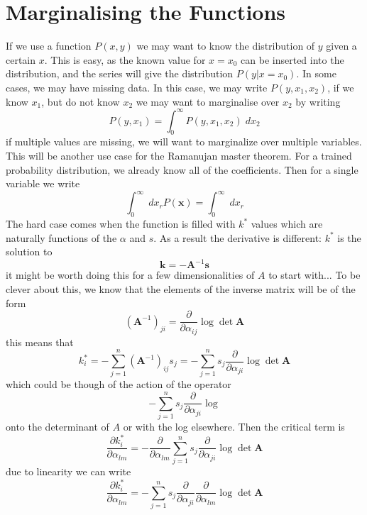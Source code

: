 \documentclass[journal=jcisd8,manuscript=article,layout=onecolumn,pdftex,floatfix,amsmath,amssymb,10pt]{achemso}
\begin{document}
\section{Marginalising the Functions}
If we use a function $P(x,y)$ we may want to know the distribution of $y$ given a certain $x$. This is easy, as the known value for $x=x_0$ can be inserted into the distribution, and the series will give the distribution $P(y|x=x_0)$. In some cases, we may have missing data. In this case, we may write $P(y,x_1,x_2)$, if we know $x_1$, but do not know $x_2$ we may want to marginalise over $x_2$ by writing
\begin{equation}
P(y,x_1) = \int_0^\infty P(y,x_1,x_2) \; dx_2
\end{equation} 
if multiple values are missing, we will want to marginalize over multiple variables. This will be another use case for the Ramanujan master theorem. For a trained probability distribution, we already know all of the coefficients. Then for a single variable we write
\begin{equation}
\int_0^\infty \; dx_r P(\mathbf{x}) = \int_0^\infty \; dx_r 
\end{equation}
The hard case comes when the function is filled with $k^*$ values which are naturally functions of the $\alpha$ and $s$. As a result the derivative is different: $k^*$ is the solution to
$$
\mathbf{k} = -\mathbf{A}^{-1}\mathbf{s}
$$
it might be worth doing this for a few dimensionalities of $A$ to start with... To be clever about this, we know that the elements of the inverse matrix will be of the form
\begin{equation}
(\mathbf{A}^{-1})_{ji} = \frac{\partial}{\partial \alpha_{ij}} \log \det \mathbf{A}
\end{equation}
this means that \begin{equation}
k_i^* = -\sum_{j=1}^n (\mathbf{A}^{-1})_{ij} s_j = -\sum_{j=1}^n s_j \frac{\partial}{\partial \alpha_{ji}} \log \det \mathbf{A}
\end{equation}
which could be though of the action of the operator 
$$
-\sum_{j=1}^n s_j \frac{\partial}{\partial \alpha_{ji}} \log
$$
onto the determinant of $A$ or with the log elsewhere. Then the critical term is
$$
\frac{\partial k_i^*}{\partial \alpha_{lm}} = - \frac{\partial}{\partial \alpha_{lm}} \sum_{j=1}^n s_j \frac{\partial}{\partial \alpha_{ji}} \log \det \mathbf{A}
$$
due to linearity we can write
$$
\frac{\partial k_i^*}{\partial \alpha_{lm}} = - \sum_{j=1}^n s_j \frac{\partial}{\partial \alpha_{ji}} \frac{\partial}{\partial \alpha_{lm}} \log \det \mathbf{A}
$$
\end{document}
